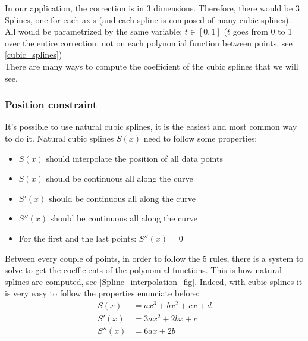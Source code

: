 In our application, the correction is in 3 dimensions. Therefore, there would be 3 Splines, one for each axis (and each spline is composed of many cubic splines). All would be parametrized by the same variable: $t\in[0,1]$ ($t$ goes from 0 to 1 over the entire correction, not on each polynomial function between points, see \autoref{cubic_splines})\\
There are many ways to compute the coefficient of the cubic splines that we will see.

\subsubsection{Position constraint}

It's possible to use natural cubic splines, it is the easiest and most common way to do it. Natural cubic splines $S(x)$ need to follow some properties:
\begin{itemize}  

        \item $S(x)$ should interpolate the position of all data points

        \item $S(x)$ should be continuous all along the curve

        \item $S'(x)$ should be continuous all along the curve

        \item $S''(x)$ should be continuous all along the curve

        \item For the first and the last points: $S''(x)=0$

\end{itemize}

Between every couple of points, in order to follow the 5 rules, there is a system to solve to get the coefficients of the polynomial functions. This is how natural splines are computed, see \autoref{Spline_interpolation_fig}. Indeed, with cubic splines it is very easy to follow the properties enunciate before:
\begin{equation}
\begin{split}
S(x) &= ax^3+bx^2+cx+d\\
S'(x) &= 3ax^2+2bx+c\\
S''(x) &= 6ax+2b
\end{split}
\end{equation}

